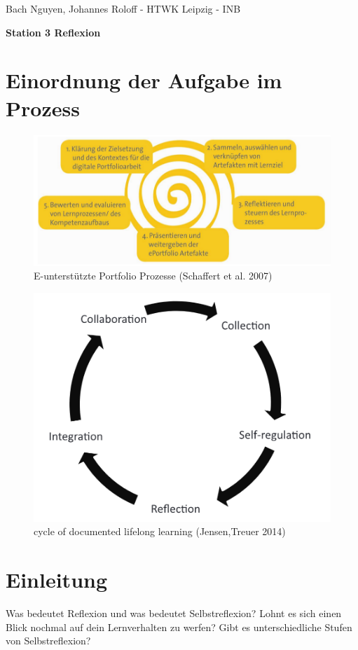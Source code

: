 \documentclass[a4paper,oneside]{scrarticle}
\begin{document}
	\begin{flushleft}
		Bach Nguyen, Johannes Roloff - HTWK Leipzig - INB
	\end{flushleft}
	\begin{center}
		\begin{LARGE}
			\textbf{Station 3 Reflexion}
		\end{LARGE}
	\end{center}
	\section*{Einordnung der Aufgabe im Prozess}
	\begin{figure} [h]
		\centering
		\includegraphics[width=0.7\linewidth]{e-portfolio-prozesse-schaffert}
		\caption{E-unterstützte Portfolio Prozesse (Schaffert et al. 2007)}
		\label{fig:e-portfolio-prozesse-schaffert}
	\end{figure}
	\begin{figure}[h]
		\centering
		\includegraphics[width=0.7\linewidth]{cycle-of-documented-lifelong-learning-Jensen}
		\caption{cycle of documented lifelong learning (Jensen,Treuer 2014)}
		\label{fig:cycle-of-documented-lifelong-learning-jensen}
	\end{figure}
	\pagebreak 
	
	\section*{Einleitung}
	Was bedeutet Reflexion und was bedeutet Selbstreflexion? Lohnt es sich einen Blick nochmal auf dein Lernverhalten zu werfen? Gibt es unterschiedliche Stufen von Selbstreflexion?
	
\end{document}
